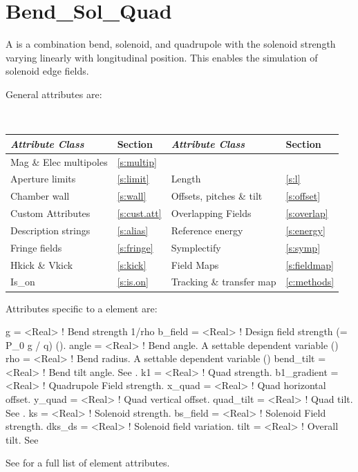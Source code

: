 \section{Bend_Sol_Quad}
\label{s:bsq}

A  is a combination bend, solenoid, and quadrupole
with the solenoid strength varying linearly with longitudinal position.
This enables the simulation of solenoid edge fields. 

General  attributes are:
\begin{center}
\tt
\begin{tabular}{llll} \toprule
  {\sl Attribute Class}      & Section           & {\sl Attribute Class}      & Section          \\ \midrule
  Mag \& Elec multipoles     & \ref{s:multip}    &                            &                  \\
  Aperture limits            & \ref{s:limit}     & Length                     & \ref{s:l}        \\
  Chamber wall               & \ref{s:wall}      & Offsets, pitches \& tilt   & \ref{s:offset}   \\
  Custom Attributes          & \ref{s:cust.att}  & Overlapping Fields         & \ref{s:overlap}  \\
  Description strings        & \ref{s:alias}     & Reference energy           & \ref{s:energy}   \\
  Fringe fields              & \ref{s:fringe}    & Symplectify                & \ref{s:symp}     \\
  Hkick \& Vkick             & \ref{s:kick}      & Field Maps                 & \ref{s:fieldmap} \\
  Is_on                      & \ref{s:is.on}     & Tracking \& transfer map   & \ref{c:methods}  \\
  \bottomrule
\end{tabular}
\end{center}
\toffset

Attributes specific to a  element are:
\begin{example}
  g           = <Real>    ! Bend strength 1/rho
  b_field     = <Real>    ! Design field strength (= P_0 g / q) ().
  angle       = <Real>    ! Bend angle. A settable dependent variable ()
  rho         = <Real>    ! Bend radius. A settable dependent variable ()
  bend_tilt   = <Real>    ! Bend tilt angle. See .
  k1          = <Real>    ! Quad strength.
  b1_gradient = <Real>    ! Quadrupole Field strength.
  x_quad      = <Real>    ! Quad horizontal offset.
  y_quad      = <Real>    ! Quad vertical offset.
  quad_tilt   = <Real>    ! Quad tilt. See .
  ks          = <Real>    ! Solenoid strength.
  bs_field    = <Real>    ! Solenoid Field strength.
  dks_ds      = <Real>    ! Solenoid field variation.      
  tilt        = <Real>    ! Overall tilt. See 
\end{example}
See  for a full list of element attributes.

